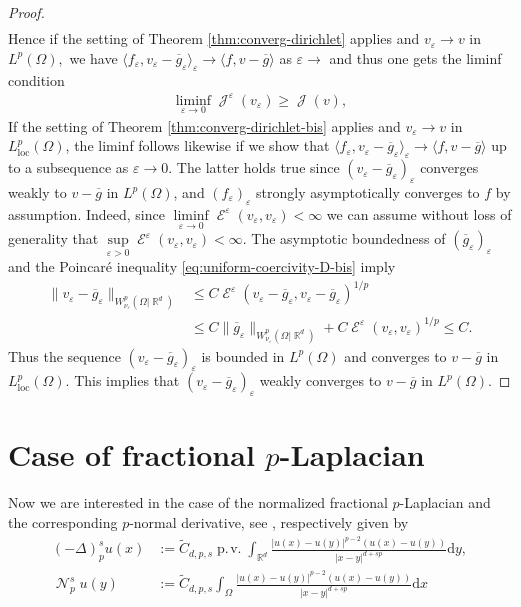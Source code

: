\documentclass[12pt, reqno]{amsart}%
\theoremstyle{plain}  %
\theoremstyle{definition}  %
\numberwithin{equation}{section}
\DeclareMathOperator{\loc}{loc}
\DeclareMathOperator{\pv}{\operatorname{p.\!v.}}
\DeclareMathOperator{\cE}{\mathcal{E}}
\DeclareMathOperator{\cN}{\mathcal{N}}
\DeclareMathOperator{\cJ}{\mathcal{J}}
\DeclareMathOperator{\R}{\mathbb{R}}
\renewcommand{\d}{\mathrm{d}}
\newcommand{\eps}{\varepsilon}
\newcommand{\WnuOmRa}{W^p_{\nu_\eps}(\Omega|\R^d )}
\begin{document}
\begin{proof}
\begin{align*}
\end{align*}
Hence if the setting of Theorem \ref{thm:converg-dirichlet} applies and $v_\eps\to v $ in $L^p(\Omega),$ we have
$\langle f_\eps,v_\eps-\overline{g}_\eps \rangle_\eps  \to  \langle f, v-\overline{g}\rangle$  as $\eps \to$ and  thus one gets the liminf condition
\begin{align*}
\liminf_{\eps\to0}\cJ^\eps(v_\eps)\geq\cJ(v),
\end{align*}
If the setting of Theorem \ref{thm:converg-dirichlet-bis} applies and $v_\eps\to v $ in $L_{\loc}^p(\Omega)$, the liminf follows likewise if we show that  $\langle f_\eps,v_\eps-\overline{g}_\eps \rangle_\eps  \to  \langle f, v-\overline{g}\rangle$ up to a subsequence as $\eps \to0$.  The latter holds  true since  $(v_\eps-\overline{g}_\eps)_\eps$ converges weakly to $v-\overline{g}$ in $L^p(\Omega)$, and $(f_\eps)_\eps$ strongly asymptotically converges to $f$ by assumption.
Indeed, since $\liminf\limits_{\eps\to0}\cE^\eps(v_\eps,v_\eps)<\infty$ we can assume without loss of generality that $\sup\limits_{\eps>0}\cE^\eps(v_\eps,v_\eps)<\infty.$ The asymptotic boundedness of $(\overline{g}_\eps)_\eps$ and the Poincar\'e inequality \eqref{eq:uniform-coercivity-D-bis} imply
\begin{align*}
\|v_\eps-\overline{g}_\eps\|_{\WnuOmRa}
&\leq
C\cE^\eps(v_\eps-\overline{g}_\eps,
v_\eps-\overline{g}_\eps)^{1/p}\\
&\leq C\|\overline{g}_\eps\|_{\WnuOmRa}+ C\cE^\eps(v_\eps,v_\eps)^{1/p}\leq C.
\end{align*}
Thus the sequence $(v_\eps-\overline{g}_\eps)_\eps $ is bounded in $L^p(\Omega)$ and converges to $v-\overline{g}$ in $L^p_{\loc}(\Omega)$. This implies that $(v_\eps-\overline{g}_\eps)_\eps$ weakly converges to $v-\overline{g}$ in $L^p(\Omega)$.
\end{proof}

\section{Case of fractional \texorpdfstring{$p$}{p}-Laplacian}\label{sec:conv-weak-solution-frac}
\noindent Now we are interested in  the case of the normalized  fractional $p$-Laplacian and the corresponding $p$-normal derivative, see \cite{Fog25}, respectively given by
\begin{align*}
(-\Delta)^s_pu(x)&:=\widetilde{C}_{d,p,s}\pv \int_{\R^d}\frac{|u(x)-u(y)|^{p-2}(u(x)-u(y))}{|x-y|^{d+sp}}\d y, \\
\cN_p^su(y)&:=\widetilde{C}_{d,p,s}\int_{\Omega}\frac{|u(x)-u(y)|^{p-2}(u(x)-u(y))}{|x-y|^{d+sp}}\d x
\end{align*}
\end{document}
